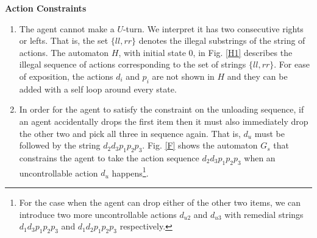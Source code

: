 \documentclass[letterpaper, 10 pt, conference]{ieeeconf}
\begin{document}
\noindent \textbf{Action Constraints} 
\begin{enumerate}
    \item The agent cannot make a $U$-turn. We interpret it has two consecutive rights or lefts. That is, the set $\{ll, rr\}$ denotes the illegal substrings of the string of actions. The automaton $H$, with initial state $0$, in Fig. \ref{H1} describes the illegal sequence of actions corresponding to the set of strings $\{ll, rr\}$. For ease of exposition, the actions $d_i$ and $p_i$ are not shown in $H$ and they can be added with a self loop around every state. %
    
    \item In order for the agent to satisfy the constraint on the unloading sequence, if an agent accidentally drops the first item then it must also immediately drop the other two and pick all three in sequence again. That is, $d_u$ must be followed by the string $d_2d_3p_1p_2p_3$. %
    Fig. \ref{F} shows the automaton $G_s$ that constrains the agent to take the action sequence $d_2d_3p_1p_2p_3$ when an uncontrollable action $d_u$ happens\footnote{For the case when the agent can drop either of the other two items, we can introduce two more uncontrollable actions $d_{u2}$ and $d_{u3}$ with remedial strings $d_1d_3p_1p_2p_3$ and $d_1d_2p_1p_2p_3$ respectively.}. 
\end{enumerate}
\end{document}
